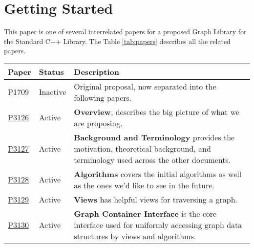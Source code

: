 
\section{Getting Started}

This paper is one of several interrelated papers for a proposed Graph Library for the Standard C++ Library. 
The Table \ref{tab:papers} describes all the related papers. 

\begin{table}[h!]
    \begin{center}
    {\begin{tabular}{l l p{14cm}}
       \hline
       \textbf{Paper}     & \textbf{Status} & \textbf{Description}                                                                                                                                                                             \\
       \hline
       P1709              & Inactive       & Original proposal, now separated into the following papers. \\
       \hdashline
       \href{https://www.wg21.link/P3126}{P3126} & Active         & \textbf{Overview}, describes the big picture of what we are proposing. \\
       \href{https://www.wg21.link/P3127}{P3127} & Active         & \textbf{Background and Terminology} provides the motivation, theoretical background, and terminology used across the other documents.\\
       \href{https://www.wg21.link/P3128}{P3128} & Active         & \textbf{Algorithms} covers the initial algorithms 
                                             as well as the ones we'd like to see in the future. \\
       \href{https://www.wg21.link/P3129}{P3129} & Active         & \textbf{Views} has helpful views for traversing a graph. \\
       \href{https://www.wg21.link/P3130}{P3130} & Active         & \textbf{Graph Container Interface} is the core interface used
                                             for uniformly accessing graph data structures by views and algorithms.

\end{tabular}}
\end{center}
\end{table}
